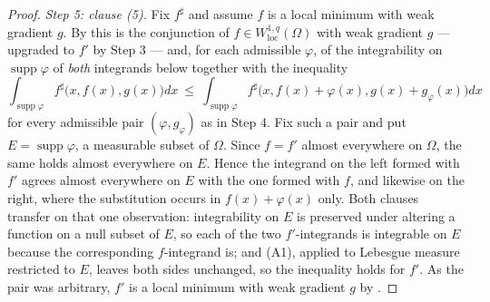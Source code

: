 \begin{proof}
\emph{Step 5: clause (5).}  Fix $f^{\sharp}$ and assume $f$ is a local minimum
with weak gradient $g$.  By  this is the conjunction of
$f\in W^{1,q}_{\mathrm{loc}}(\Omega)$ with weak gradient $g$ --- upgraded to
$f'$ by Step 3 --- and, for each admissible $\varphi$, of the integrability on
$\operatorname{supp}\varphi$ of \emph{both} integrands below together with the
inequality
\[
\int_{\operatorname{supp}\varphi}f^{\sharp}\bigl(x,f(x),g(x)\bigr)dx
\ \le\
\int_{\operatorname{supp}\varphi}f^{\sharp}\bigl(x,f(x)+\varphi(x),g(x)+g_\varphi(x)\bigr)dx
\]
for every admissible pair $(\varphi,g_\varphi)$ as in Step 4.  Fix such a pair
and put $E=\operatorname{supp}\varphi$, a measurable subset of $\Omega$.  Since
$f=f'$ almost everywhere on $\Omega$, the same holds almost everywhere on $E$.
Hence the integrand on the left formed with $f'$ agrees almost everywhere on $E$
with the one formed with $f$, and likewise on the right, where the substitution
occurs in $f(x)+\varphi(x)$ only.  Both clauses transfer on that one
observation: integrability on $E$ is preserved under altering a function on a
null subset of $E$, so each of the two $f'$-integrands is integrable on $E$
because the corresponding $f$-integrand is; and (A1), applied to Lebesgue
measure restricted to $E$, leaves both sides unchanged, so the inequality holds
for $f'$.  As the pair was arbitrary, $f'$ is a local minimum with weak gradient $g$
by \noderef{IsLocalMinimumOn}.
\end{proof}
